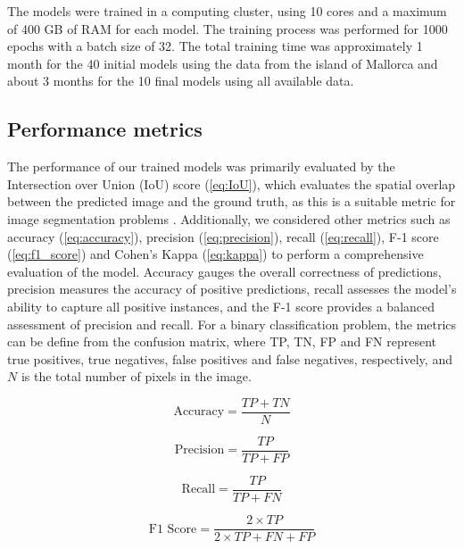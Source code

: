 The models were trained in a computing cluster, using 10 cores and a maximum of
400 GB of RAM for each model. The training process was performed for 1000
epochs with a batch size of 32. The total training time was approximately 1
month for the 40 initial models using the data from the island of Mallorca and
about 3 months for the 10 final models using all available data.

\subsection{Performance metrics}

The performance of our trained models was primarily evaluated by the
Intersection over Union (IoU) score (\cref{eq:IoU}), which evaluates the
spatial overlap between the predicted image and the ground truth, as this is a
suitable metric for image segmentation problems \cite{rahman2016optimizing}.
Additionally, we considered other metrics such as accuracy
(\cref{eq:accuracy}), precision (\cref{eq:precision}), recall
(\cref{eq:recall}), F-1 score (\cref{eq:f1_score}) and Cohen's Kappa
(\cref{eq:kappa}) to perform a comprehensive evaluation of the model. Accuracy
gauges the overall correctness of predictions, precision measures the accuracy
of positive predictions, recall assesses the model's ability to capture all
positive instances, and the F-1 score provides a balanced assessment of
precision and recall. For a binary classification problem, the metrics can be
define from the confusion matrix, where TP, TN, FP and FN represent true
positives, true negatives, false positives and false negatives, respectively,
and $N$ is the total number of pixels in the image.

\begin{equation}\label{eq:accuracy}
    \text{Accuracy} = \frac{TP + TN}{N}
\end{equation}

\begin{equation}\label{eq:precision}
    \text{Precision} = \frac{TP}{TP + FP}
\end{equation}

\begin{equation}\label{eq:recall}
    \text{Recall} = \frac{TP}{TP + FN}
\end{equation}

\begin{equation}\label{eq:f1_score}
    \text{F1 Score} = \frac{2\times TP}{2\times TP + FN + FP}
\end{equation}

